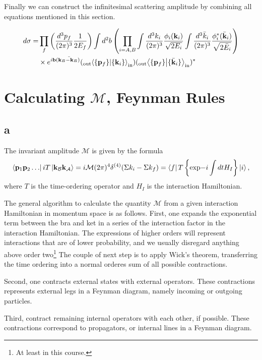\documentclass[11pt, a4paper]{amsart}
\begin{document}
Finally we can construct the infinitesimal scattering amplitude by combining all equations mentioned in this section.

\begin{align}
d\sigma =& \prod_f \left( \frac{d^3p_f}{(2\pi)^3} \frac{1}{2E_f} \right) \int d^2b \left(\prod_{i = A,B}\int \frac{d^3k_i}{(2\pi)^3} \frac{\phi_i(\vb{k}_i)}{\sqrt{2E_i}} \int \frac{d^3\bar{k}_i}{(2\pi)^3} \frac{\phi_i^*(\bar{\vb{k}}_i)}{\sqrt{2\bar{E}_i}} \right) \\
&\times e^{i\vb{b}(\bar{\vb{k}_B - \vb{k}_B)}}(_{\text{out}}\braket{\{\vb{p}_f\}}{\{\vb{k}_i\}}_{\text{in}})(_{\text{out}}\braket{\{\vb{p}_f\}}{\{\bar{\vb{k}}_i\}}_{\text{in}})^*
\end{align}

\section{Calculating $\mathcal{M}$, Feynman Rules}

\subsection*{a}

The invariant amplitude $\mathcal{M}$ is given by the formula
\begin{equation}
\bra{\vb{p}_1 \vb{p}_2 \dots} iT \ket{\vb{k}_{\mathcal{B}}\vb{k}_{\mathcal{A}}} = i \mathcal{M} (2\pi)^4 \delta^{(4)}(\Sigma k_i -\Sigma  k_f)
= \bra{f}T\left\{\text{exp}{-i\int dt H_I} \right\} \ket{i},
\end{equation}
where $T$ is the time-ordering operator and $H_I$ is the interaction Hamiltonian.

The general algorithm to calculate the quantity $\mathcal{M}$ from a given interaction Hamiltonian in momentum space is as follows. First, one expands the exponential term between the bra and ket in a series of the interaction factor in the interaction Hamiltonian. The expressions of higher orders will represent interactions that are of lower probability, and we usually disregard anything above order two\footnote{At least in this course.} The couple of next step is to apply Wick's theorem, transferring the time ordering into a normal orderes sum of all possible contractions.

Second, one contracts external states with external operators. These contractions represents external legs in a Feynman diagram, namely incoming or outgoing particles. 

Third, contract remaining internal operators with each other, if possible.  These contractions correspond to propagators, or internal lines in a Feynman diagram.
\end{document}
